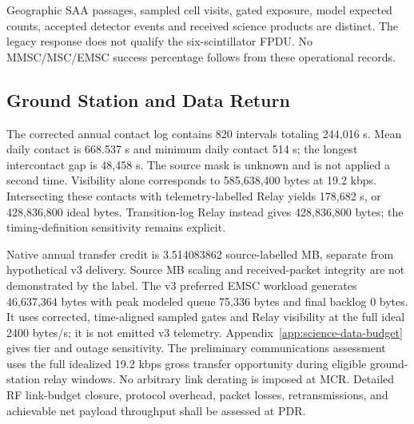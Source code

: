 Geographic SAA passages, sampled cell visits, gated exposure, model expected counts, accepted detector events and received science products are distinct. The legacy response does not qualify the six-scintillator FPDU. No MMSC/MSC/EMSC success percentage follows from these operational records.
\subsection{Ground Station and Data Return}\label{sec:sim-coverage}
The corrected annual contact log contains 820 intervals totaling 244,016 s. Mean daily contact is 668.537 s and minimum daily contact 514 s; the longest intercontact gap is 48,458 s. The source mask is unknown and is not applied a second time. Visibility alone corresponds to 585,638,400 bytes at 19.2 kbps. Intersecting these contacts with telemetry-labelled Relay yields 178,682 s, or 428,836,800 ideal bytes. Transition-log Relay instead gives 428,836,800 bytes; the timing-definition sensitivity remains explicit.

Native annual transfer credit is 3.514083862 source-labelled MB, separate from hypothetical v3 delivery. Source MB scaling and received-packet integrity are not demonstrated by the label. The v3 preferred EMSC workload generates 46,637,364 bytes with peak modeled queue 75,336 bytes and final backlog 0 bytes. It uses corrected, time-aligned sampled gates and Relay visibility at the full ideal 2400 bytes/s; it is not emitted v3 telemetry. Appendix~\ref{app:science-data-budget} gives tier and outage sensitivity.
The preliminary communications assessment uses the full idealized 19.2 kbps gross transfer opportunity during eligible ground-station relay windows. No arbitrary link derating is imposed at MCR. Detailed RF link-budget closure, protocol overhead, packet losses, retransmissions, and achievable net payload throughput shall be assessed at PDR.
